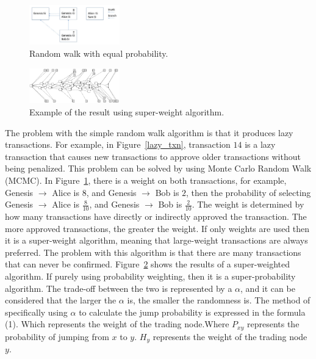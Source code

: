 \begin{figure}[!ht]
\begin{center}
\includegraphics[width=0.35\textwidth]{figures/random_unequal.png}
    \caption{
        Random walk with equal probability.
     }
\label{random_unequal}
\end{center}
\end{figure}

\begin{figure}[!ht]
\begin{center}
\includegraphics[width=0.35\textwidth]{figures/super_weight.png}
    \caption{
        Example of the result using super-weight algorithm.
     }
\label{super_weight}
\end{center}
\end{figure}

The problem with the simple random walk algorithm is that it produces lazy transactions.
For example, in Figure~\ref{lazy_txn}, transaction $14$ is a lazy transaction that causes new transactions to approve older transactions without being penalized.
This problem can be solved by using Monte Carlo Random Walk (MCMC).
In Figure~\ref{random_unequal}, there is a weight on both transactions, for example, Genesis $\rightarrow$ Alice is $8$, and Genesis $\rightarrow$ Bob is $2$,
then the probability of selecting Genesis $\rightarrow$ Alice is $\frac{8}{10}$,
and Genesis $\rightarrow$ Bob is $\frac{2}{10}$. 
The weight is determined by how many transactions have directly or indirectly approved the transaction.
The more approved transactions, the greater the weight.
If only weights are used then it is a super-weight algorithm, meaning that large-weight transactions are always preferred.
The problem with this algorithm is that there are many transactions that can never be confirmed.
Figure~\ref{super_weight} shows the results of a super-weighted algorithm. 
If purely using probability weighting, then it is a
super-probability algorithm. The trade-off between the two is represented by a $\alpha$, and it can be considered that the
larger the $\alpha$ is, the smaller the randomness is.
The method of specifically using $\alpha$ to calculate the jump probability is expressed in the formula (1).
Which represents the weight of the trading node.Where $P_{xy}$ represents the probability of jumping from $x$ to $y$. $H_{y}$ represents the weight of the trading node $y$.

